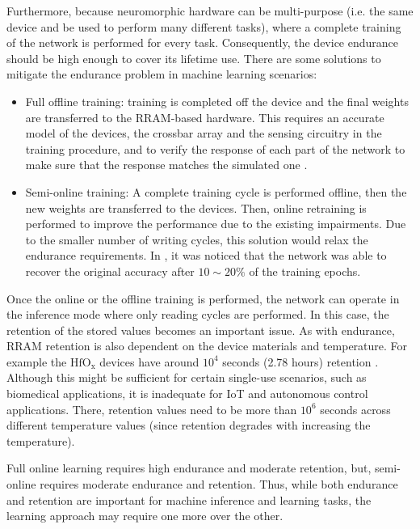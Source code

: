 \documentclass[english]{article}
\renewcommand{\cite}{\citep}
\begin{document}
Furthermore, because neuromorphic hardware can be multi-purpose (i.e. the same device and be used to perform many different tasks), where a complete training of the network is performed for every task. Consequently, the device endurance should be high enough to cover its lifetime use. 
There are some solutions to mitigate the endurance problem in machine learning scenarios: 
%
\begin{itemize}
  \item Full offline training: training is completed off the device and the final weights are transferred to the RRAM-based hardware. This requires an accurate model of the devices, the crossbar array and the sensing circuitry in the training procedure, and to verify the response of each part of the network to make sure that the response matches the simulated one \cite{jain2018rx}.  
  \item Semi-online training: A complete training cycle is performed offline, then the new weights are transferred to the devices. Then, online retraining is performed to improve the performance due to the existing impairments. Due to the smaller number of writing cycles, this solution would relax the endurance requirements. In \cite{fouda2018overcoming}, it was noticed that the network was able to recover the original accuracy after $10\sim20\%$ of the training epochs. 
\end{itemize}
%
Once the online or the offline training is performed, the network can operate in the inference mode where only reading cycles are performed. In this case, the retention of the stored values becomes an important issue. As with endurance, RRAM retention is also dependent on the device materials and temperature. 
For example the $\mathrm{HfO_x}$ devices have around $10^4$ seconds (2.78 hours) retention \cite{azzaz2016endurance}. 
Although this might be sufficient for certain single-use scenarios, such as biomedical applications, it is inadequate for IoT and autonomous control applications. 
There, retention values need to be more than $10^6$ seconds across different temperature values (since retention degrades with increasing the temperature).  

Full online learning requires high endurance and moderate retention, but, semi-online requires moderate endurance and retention.
Thus, while both endurance and retention are important for machine inference and learning tasks, the learning approach may require one more over the other. 
\end{document}
